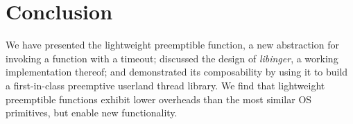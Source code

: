 \section{Conclusion}

We have presented the lightweight preemptible function, a new abstraction for
invoking a function with a timeout; discussed the design of \textit{libinger}, a
working implementation thereof; and demonstrated its composability by using it to
build a first-in-class preemptive userland thread library.  We find that lightweight
preemptible functions exhibit lower overheads than the most similar OS primitives, but
enable new functionality.
